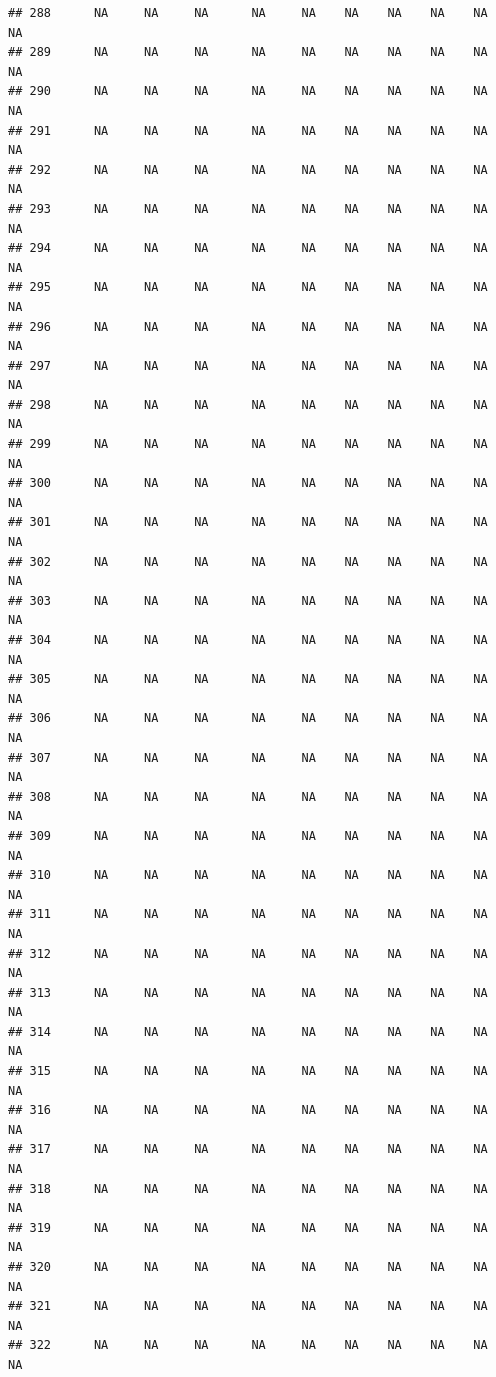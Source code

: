 \documentclass{article}\usepackage{graphicx, color}
\makeatletter
\newenvironment{kframe}{%
 \def\at@end@of@kframe{}%
 \ifinner\ifhmode%
  \def\at@end@of@kframe{\end{minipage}}%
  \begin{minipage}{\columnwidth}%
 \fi\fi%
 \def\FrameCommand##1{\hskip\@totalleftmargin \hskip-\fboxsep
 \colorbox{shadecolor}{##1}\hskip-\fboxsep
     \hskip-\linewidth \hskip-\@totalleftmargin \hskip\columnwidth}%
 \MakeFramed {\advance\hsize-\width
   \@totalleftmargin\z@ \linewidth\hsize
   \@setminipage}}%
 {\par\unskip\endMakeFramed%
 \at@end@of@kframe}
\newenvironment{knitrout}{}{} %
\makeatother
\begin{document}
\begin{knitrout}
\begin{kframe}
\begin{verbatim}
## 288      NA     NA     NA      NA     NA    NA    NA    NA    NA     NA
## 289      NA     NA     NA      NA     NA    NA    NA    NA    NA     NA
## 290      NA     NA     NA      NA     NA    NA    NA    NA    NA     NA
## 291      NA     NA     NA      NA     NA    NA    NA    NA    NA     NA
## 292      NA     NA     NA      NA     NA    NA    NA    NA    NA     NA
## 293      NA     NA     NA      NA     NA    NA    NA    NA    NA     NA
## 294      NA     NA     NA      NA     NA    NA    NA    NA    NA     NA
## 295      NA     NA     NA      NA     NA    NA    NA    NA    NA     NA
## 296      NA     NA     NA      NA     NA    NA    NA    NA    NA     NA
## 297      NA     NA     NA      NA     NA    NA    NA    NA    NA     NA
## 298      NA     NA     NA      NA     NA    NA    NA    NA    NA     NA
## 299      NA     NA     NA      NA     NA    NA    NA    NA    NA     NA
## 300      NA     NA     NA      NA     NA    NA    NA    NA    NA     NA
## 301      NA     NA     NA      NA     NA    NA    NA    NA    NA     NA
## 302      NA     NA     NA      NA     NA    NA    NA    NA    NA     NA
## 303      NA     NA     NA      NA     NA    NA    NA    NA    NA     NA
## 304      NA     NA     NA      NA     NA    NA    NA    NA    NA     NA
## 305      NA     NA     NA      NA     NA    NA    NA    NA    NA     NA
## 306      NA     NA     NA      NA     NA    NA    NA    NA    NA     NA
## 307      NA     NA     NA      NA     NA    NA    NA    NA    NA     NA
## 308      NA     NA     NA      NA     NA    NA    NA    NA    NA     NA
## 309      NA     NA     NA      NA     NA    NA    NA    NA    NA     NA
## 310      NA     NA     NA      NA     NA    NA    NA    NA    NA     NA
## 311      NA     NA     NA      NA     NA    NA    NA    NA    NA     NA
## 312      NA     NA     NA      NA     NA    NA    NA    NA    NA     NA
## 313      NA     NA     NA      NA     NA    NA    NA    NA    NA     NA
## 314      NA     NA     NA      NA     NA    NA    NA    NA    NA     NA
## 315      NA     NA     NA      NA     NA    NA    NA    NA    NA     NA
## 316      NA     NA     NA      NA     NA    NA    NA    NA    NA     NA
## 317      NA     NA     NA      NA     NA    NA    NA    NA    NA     NA
## 318      NA     NA     NA      NA     NA    NA    NA    NA    NA     NA
## 319      NA     NA     NA      NA     NA    NA    NA    NA    NA     NA
## 320      NA     NA     NA      NA     NA    NA    NA    NA    NA     NA
## 321      NA     NA     NA      NA     NA    NA    NA    NA    NA     NA
## 322      NA     NA     NA      NA     NA    NA    NA    NA    NA     NA

\end{verbatim}
\end{kframe}
\end{knitrout}
\end{document}
